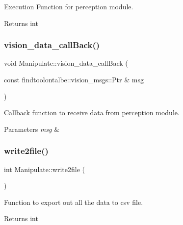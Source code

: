 Execution Function for perception module. 

\begin{DoxyReturn}{Returns}
int 
\end{DoxyReturn}
\mbox{\label{structManipulate_ae32c3e2815aae04cc22224eddfa61078}} 
\subsubsection{\texorpdfstring{vision\+\_\+data\+\_\+call\+Back()}{vision\_data\_callBack()}}
{\footnotesize\ttfamily void Manipulate\+::vision\+\_\+data\+\_\+call\+Back (\begin{DoxyParamCaption}\item[{const findtoolontalbe\+::vision\+\_\+msgs\+::\+Ptr \&}]{msg }\end{DoxyParamCaption})\hspace{0.3cm}{\ttfamily [private]}}



Callback function to receive data from perception module. 


\begin{DoxyParams}{Parameters}
{\em msg} & \\
\hline
\end{DoxyParams}
\mbox{\label{structManipulate_a4496399bd56cc674257ab8a44c991647}} 
\subsubsection{\texorpdfstring{write2file()}{write2file()}}
{\footnotesize\ttfamily int Manipulate\+::write2file (\begin{DoxyParamCaption}{ }\end{DoxyParamCaption})\hspace{0.3cm}{\ttfamily [private]}}



Function to export out all the data to csv file. 

\begin{DoxyReturn}{Returns}
int 
\end{DoxyReturn}


